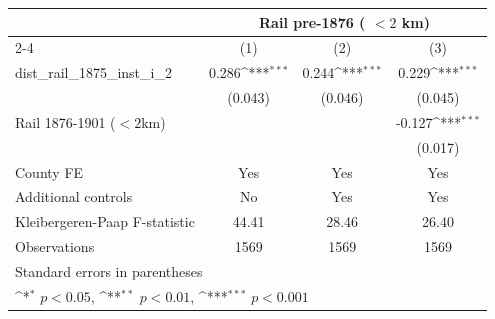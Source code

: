 {
\def\sym#1{\ifmmode^{#1}\else\(^{#1}\)\fi}
\begin{tabular}{l*{3}{c}}
\toprule
                &\multicolumn{3}{c}{Rail pre-1876 ( $<2$ km)}            \\\cmidrule(lr){2-4}
                &\multicolumn{1}{c}{(1)}         &\multicolumn{1}{c}{(2)}         &\multicolumn{1}{c}{(3)}         \\
\midrule
dist\_rail\_1875\_inst\_i\_2&    0.286\sym{***}&    0.244\sym{***}&    0.229\sym{***}\\
                &  (0.043)         &  (0.046)         &  (0.045)         \\
Rail 1876-1901 ($<2$km)&                  &                  &   -0.127\sym{***}\\
                &                  &                  &  (0.017)         \\
County FE       &      Yes         &      Yes         &      Yes         \\
Additional controls &       No         &      Yes         &      Yes         \\
\midrule
Kleibergeren-Paap F-statistic&    44.41         &    28.46         &    26.40         \\
Observations    &     1569         &     1569         &     1569         \\
\bottomrule
\multicolumn{4}{l}{\footnotesize Standard errors in parentheses}\\
\multicolumn{4}{l}{\footnotesize \sym{*} \(p<0.05\), \sym{**} \(p<0.01\), \sym{***} \(p<0.001\)}\\
\end{tabular}
}
